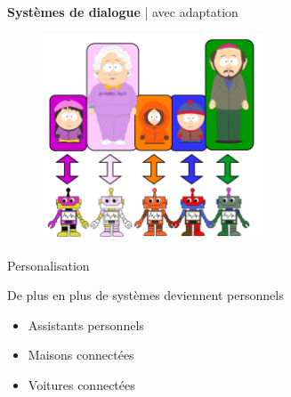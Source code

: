 \documentclass[french]{beamer}
\begin{document}
    \begin{frame}{\textbf{Systèmes de dialogue} | avec adaptation}
        \begin{figure}
            \begin{center}
                \includegraphics[width=0.6\textwidth]{img/adap1.pdf}
            \end{center}
        \end{figure}
    \end{frame}

    \begin{frame}{Personalisation}

        De plus en plus de systèmes deviennent personnels

        \begin{itemize}
            \item Assistants personnels %
            \item Maisons connectées %
            \item Voitures connectées
        \end{itemize}


    \end{frame}
\end{document}
